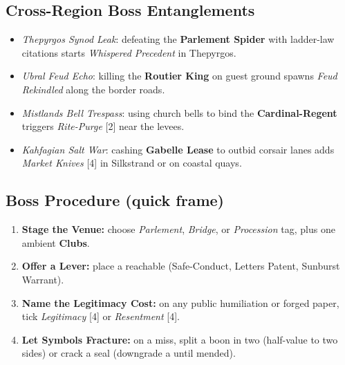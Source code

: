\subsection*{Cross-Region Boss Entanglements}
\begin{itemize}
  \item \emph{Thepyrgos Synod Leak}: defeating the \textbf{Parlement Spider} with ladder-law citations starts \emph{Whispered Precedent} in Thepyrgos.
  \item \emph{Ubral Feud Echo}: killing the \textbf{Routier King} on guest ground spawns \emph{Feud Rekindled} along the border roads.
  \item \emph{Mistlands Bell Trespass}: using church bells to bind the \textbf{Cardinal-Regent} triggers \emph{Rite-Purge} [2] near the levees.
  \item \emph{Kahfagian Salt War}: cashing \textbf{Gabelle Lease} to outbid corsair lanes adds \emph{Market Knives} [4] in Silkstrand or on coastal quays.
\end{itemize}

\subsection*{Boss Procedure (quick frame)}
\begin{enumerate}
  \item \textbf{Stage the Venue:} choose \emph{Parlement}, \emph{Bridge}, or \emph{Procession} tag, plus one ambient \textbf{Clubs}.
  \item \textbf{Offer a Lever:} place a reachable \Diamond{} (Safe-Conduct, Letters Patent, Sunburst Warrant).
  \item \textbf{Name the Legitimacy Cost:} on any public humiliation or forged paper, tick \emph{Legitimacy} [4] or \emph{Resentment} [4].
  \item \textbf{Let Symbols Fracture:} on a miss, split a boon in two (half-value to two sides) or crack a seal (downgrade a \Diamond{} until mended).
\end{enumerate}